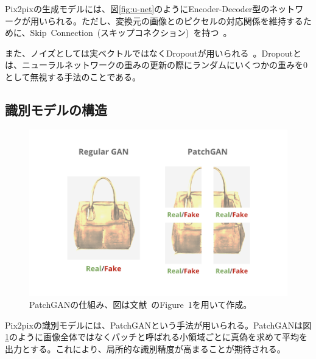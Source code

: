 Pix2pixの生成モデルには、図\ref{fig:u-net}のようにEncoder-Decoder型のネットワークが用いられる。ただし、変換元の画像とのピクセルの対応関係を維持するために、Skip~Connection~(スキップコネクション)~を持つ~\cite{u-net}。

また、ノイズとしては実ベクトルではなくDropoutが用いられる~\cite{Dropout}。Dropoutとは、ニューラルネットワークの重みの更新の際にランダムにいくつかの重みを0として無視する手法のことである。

\subsection{識別モデルの構造}

\begin{figure}[t]
\begin{center}
\includegraphics[width=\hsize]{figure/patchgan.png}
\caption{PatchGANの仕組み、図は文献~\cite{pix2pix}のFigure~1を用いて作成。}
\label{fig:patchgan}
\end{center}
\end{figure}

Pix2pixの識別モデルには、PatchGANという手法が用いられる。PatchGANは図\ref{fig:patchgan}のように画像全体ではなくパッチと呼ばれる小領域ごとに真偽を求めて平均を出力とする。これにより、局所的な識別精度が高まることが期待される。